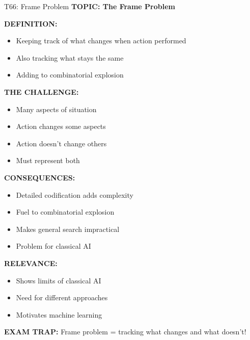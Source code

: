 \documentclass[8pt]{beamer}
\begin{document}
	\begin{frame}{T66: Frame Problem}
		\fontsize{6.5}{7.5}\selectfont
		\textbf{TOPIC: The Frame Problem}
		
		\vspace{0.1cm}
		\textbf{DEFINITION:}
		\begin{itemize}
			\item Keeping track of what changes when action performed
			\item Also tracking what stays the same
			\item Adding to combinatorial explosion
		\end{itemize}
		
		\vspace{0.1cm}
		\textbf{THE CHALLENGE:}
		\begin{itemize}
			\item Many aspects of situation
			\item Action changes some aspects
			\item Action doesn't change others
			\item Must represent both
		\end{itemize}
		
		\vspace{0.1cm}
		\textbf{CONSEQUENCES:}
		\begin{itemize}
			\item Detailed codification adds complexity
			\item Fuel to combinatorial explosion
			\item Makes general search impractical
			\item Problem for classical AI
		\end{itemize}
		
		\vspace{0.1cm}
		\textbf{RELEVANCE:}
		\begin{itemize}
			\item Shows limits of classical AI
			\item Need for different approaches
			\item Motivates machine learning
		\end{itemize}
		
		\textcolor{myred}{\textbf{EXAM TRAP:}} Frame problem = \textcolor{myblue}{tracking what changes and what doesn't}!
	\end{frame}
	
\end{document}
